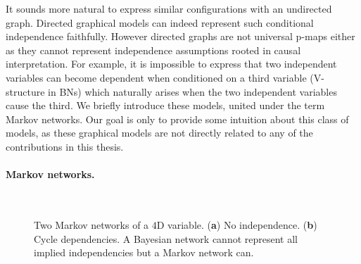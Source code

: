It sounds more natural to express similar configurations with an undirected graph. Directed graphical models can indeed represent such conditional independence faithfully. However directed graphs are not universal p-maps either as they cannot represent independence assumptions rooted in causal interpretation. For example, it is impossible to express that two independent variables can become dependent when conditioned on a third variable (V-structure in BNs) which naturally arises when the two independent variables cause the third. We briefly introduce these models, united under the term Markov networks. Our goal is only to provide some intuition about this class of models, as these graphical models are not directly related to any of the contributions in this thesis.
\paragraph{Markov networks.}
\begin{figure}
    \centering
    \begin{subfigure}{.45\textwidth}
        \centering
        \caption{}\label{fig:MN-fig-a}
    \end{subfigure}~\hspace{-4.8em}
    \begin{subfigure}{.45\textwidth}
    \centering
        \caption{}\label{fig:MN-fig-b}
    \end{subfigure}
    \caption{Two Markov networks of a $4$D variable. (\textbf{a}) No independence. (\textbf{b}) Cycle dependencies. A Bayesian network cannot represent all implied independencies but a Markov network can.} \label{fig:MN-fig}
\end{figure}
